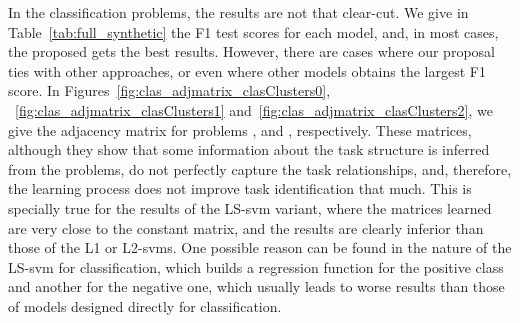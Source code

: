 %
In the classification problems, the results are not that clear-cut.
We give in Table~\ref{tab:full_synthetic} the F1 test scores for each model, and, in most cases, the proposed  gets the best results.
However, there are cases where our proposal ties with other approaches, or even where other models obtains the largest F1 score.
%
In Figures~\ref{fig:clas_adjmatrix_clasClusters0}, ~\ref{fig:clas_adjmatrix_clasClusters1} and~\ref{fig:clas_adjmatrix_clasClusters2}, we give the adjacency matrix for problems ,  and , respectively.
%
These matrices, although they show that some information about the task structure is inferred from the problems, do not perfectly capture the task relationships, and, therefore, the learning process does not improve task identification that much.
This is specially true for the results of the LS-\acrshort{svm} variant, where the matrices learned are very close to the constant matrix, and the results are clearly inferior than those of the L1 or L2-\acrshort{svms}.
One possible reason can be found in the nature of the LS-\acrshort{svm} for classification, which builds a regression function for the positive class and another for the negative one, which usually leads to worse results than those of models designed directly for classification.

%



